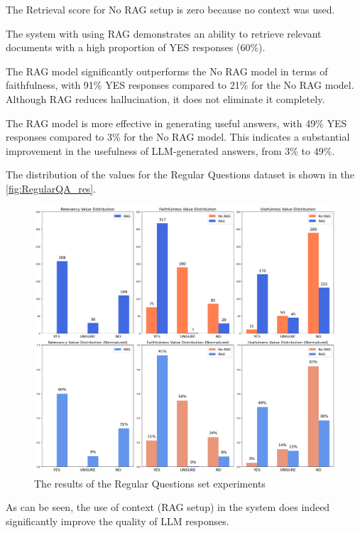 The Retrieval score for No RAG setup is zero because no context was used. 

The system with using RAG demonstrates an ability to retrieve relevant documents with a high proportion of YES responses (60\%).

The RAG model significantly outperforms the No RAG model in terms of faithfulness, with 91\% YES responses compared to 21\% for the No RAG model. Although RAG reduces hallucination, it does not eliminate it completely.

The RAG model is more effective in generating useful answers, with 49\% YES responses compared to 3\% for the No RAG model. This indicates a substantial improvement in the usefulness of LLM-generated answers, from 3\% to 49\%.

The distribution of the values for the Regular Questions dataset is shown in the \autoref{fig:RegularQA_res}.
\begin{figure}[H]
\centering
\includegraphics[width=\textwidth,height=\textheight,keepaspectratio]{Figures/RegularQA_res.png}
\caption{The results of the Regular Questions set experiments}
\label{fig:RegularQA_res}
\end{figure}

As can be seen, the use of context (RAG setup) in the system does indeed significantly improve the quality of LLM responses.

